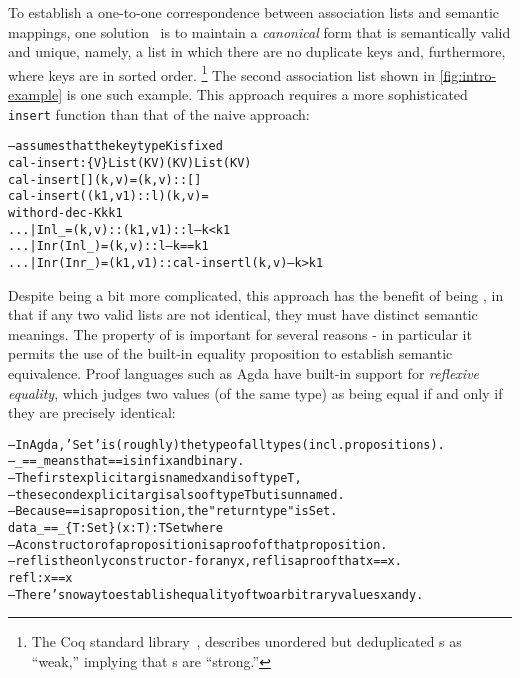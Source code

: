 To establish a one-to-one correspondence between association lists and semantic mappings, one solution~\citep{FMapList} is to maintain a \emph{canonical}
%
form that is semantically valid and unique, namely, a list in which there are no duplicate keys and, furthermore, where keys are in sorted order.%
%
\footnote{\hspace{0.01in}%
%
The Coq standard library~\citep{FMapInterface}, describes unordered but deduplicated \sal{}s as ``weak,'' implying that \cal{}s are ``strong.''
%
}
%
The second association list shown in \autoref{fig:intro-example} is one such example.
%
This approach requires a more sophisticated \texttt{insert} function than that of the naive \sal{} approach:
\begin{alltt}
  -- assumes that the key type K is fixed
  cal-insert : \altFAll\{V\} \altRArr List (K \altTimes V) \altRArr (K \altTimes V) \altRArr List (K \altTimes V)
  cal-insert [] (k , v) = (k , v) :: []
  cal-insert ((k1 , v1) :: l) (k , v) =
    with ord-dec-K k k1
  ... | Inl \_       = (k , v) :: (k1 , v1) :: l         -- k < k1
  ... | Inr (Inl \_) = (k , v) :: l                      -- k == k1
  ... | Inr (Inr \_) = (k1 , v1) :: cal-insert l (k , v) -- k > k1
\end{alltt}

Despite being a bit more complicated, this approach has the benefit of being \extensional{}, in that if any two valid lists are not identical, they must have distinct semantic meanings.
%
The property of \SemInj{} is important for several reasons - in particular it permits the use of the built-in equality proposition to establish semantic equivalence.
%
Proof languages such as Agda have built-in support for \emph{reflexive equality}, which judges two values (of the same type) as being equal if and only if they are precisely identical:
\begin{alltt}
  -- In Agda, 'Set' is (roughly) the type of all types (incl. propositions).
  -- \_==\_ means that == is infix and binary.
  -- The first explicit arg is named x and is of type T,
  -- the second explicit arg is also of type T but is unnamed.
  -- Because == is a proposition, the "return type" is Set.
  data \_==\_ \{T : Set\} (x : T) : T \altRArr Set where
    -- A constructor of a proposition is a proof of that proposition.
    -- refl is the only constructor - for any x, refl is a proof that x == x.
    refl : x == x
    -- There's no way to establish equality of two arbitrary values x and y.
\end{alltt}


